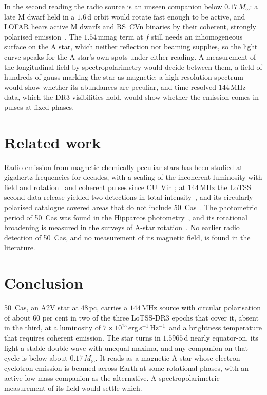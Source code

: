 \documentclass[3p,11pt]{elsarticle}
\newcommand{\lnu}{erg\,s$^{-1}$\,Hz$^{-1}$}
\newcommand{\sci}[2]{#1\times10^{#2}}
\newcommand{\Msun}{M_\odot}
\begin{document}
In the second reading the radio source is an unseen companion below $0.17\,\Msun$: a
late M dwarf held in a $1.6$\,d orbit would rotate fast enough to be active, and LOFAR
hears active M dwarfs and RS~CVn binaries by their coherent, strongly polarised
emission~\cite{Callingham2021,Toet2021}. The $1.54$\,mmag term at $f$ still needs an
inhomogeneous surface on the A star, which neither reflection nor beaming supplies, so
the light curve speaks for the A star's own spots under either reading. A measurement of
the longitudinal field by spectropolarimetry would decide between them, a field of
hundreds of gauss marking the star as magnetic; a high-resolution spectrum would show
whether its abundances are peculiar, and time-resolved $144$\,MHz data, which the DR3
visibilities hold, would show whether the emission comes in pulses at fixed phases.

\section{Related work}\label{sec:related}

Radio emission from magnetic chemically peculiar stars has been studied at gigahertz
frequencies for decades, with a scaling of the incoherent luminosity with field and
rotation~\cite{Leto2021} and coherent pulses since CU~Vir~\cite{Trigilio2000}; at
$144$\,MHz the LoTSS second data release yielded two detections in total
intensity~\cite{Hajduk2022}, and its circularly polarised catalogue covered areas that do
not include 50~Cas~\cite{Callingham2023}. The photometric period of 50~Cas was found in
the Hipparcos photometry~\cite{KoenEyer2002}, and its rotational broadening is measured
in the surveys of A-star rotation~\cite{AbtMorrell1995,Royer2002,Royer2007}. No earlier
radio detection of 50~Cas, and no measurement of its magnetic field, is found in the
literature.

\section{Conclusion}\label{sec:conclusion}

50~Cas, an A2V star at $48$\,pc, carries a $144$\,MHz source with circular
polarisation of about $60$ per cent in two of the three LoTSS-DR3 epochs that cover it,
absent in the third, at a luminosity of $\sci{7}{15}$\,\lnu\ and a brightness temperature
that requires coherent emission. The star turns in $1.5965$\,d nearly equator-on, its
light a stable double wave with unequal maxima, and any companion on that cycle is below
about $0.17\,\Msun$. It reads as a magnetic A star whose electron-cyclotron emission is
beamed across Earth at some rotational phases, with an active low-mass companion as the
alternative. A spectropolarimetric measurement of its field would settle which.
\end{document}
